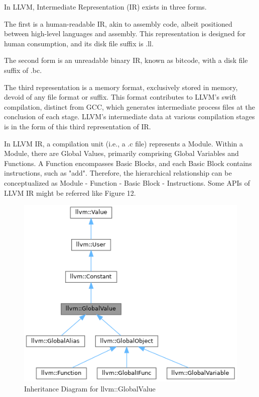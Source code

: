 \documentclass[conference]{IEEEtran}
\begin{document}
In LLVM, Intermediate Representation (IR) exists in three forms.

The first is a human-readable IR, akin to assembly code, albeit positioned between high-level languages and assembly. This representation is designed for human consumption, and its disk file suffix is .ll.

The second form is an unreadable binary IR, known as bitcode, with a disk file suffix of .bc.

The third representation is a memory format, exclusively stored in memory, devoid of any file format or suffix. This format contributes to LLVM's swift compilation, distinct from GCC, which generates intermediate process files at the conclusion of each stage. LLVM's intermediate data at various compilation stages is in the form of this third representation of IR.

In LLVM IR, a compilation unit (i.e., a .c file) represents a Module. Within a Module, there are Global Values, primarily comprising Global Variables and Functions. A Function encompasses Basic Blocks, and each Basic Block contains instructions, such as "add". Therefore, the hierarchical relationship can be conceptualized as Module - Function - Basic Block - Instructions. Some APIs of LLVM IR might be referred like Figure 12.

\begin{figure}[htbp]
\centering
\includegraphics [width=0.95\linewidth]{pictures/LLVMInheritanceDiagram.png}
\caption{Inheritance Diagram for llvm::GlobalValue\cite{b10}}
\label{fig12}
\end{figure}
\end{document}
